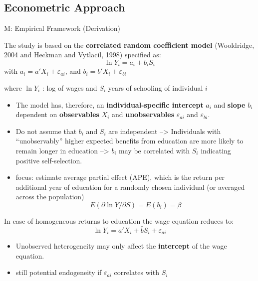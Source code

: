 \documentclass[10pt,ignorenonframetext,]{beamer}
\begin{document}
\hypertarget{econometric-approach}{%
\subsection{Econometric Approach}\label{econometric-approach}}

\begin{frame}[allowframebreaks]{M: Empirical Framework (Derivation)}
\protect\hypertarget{m-empirical-framework-derivation}{}

The study is based on the \textbf{correlated random coefficient model}
(Wooldridge, 2004 and Heckman and Vytlacil, 1998) specified as:
\[\ln Y_i = a_i + b_i S_i\] with \(a_i = a'X_i + \varepsilon_{ai}\), and
\(b_i = b'X_i + \varepsilon_{bi}\)

where \(\ln Y_i\) : log of wages and \(S_i\) years of schooling of
individual \(i\)

\begin{itemize}
\item
  The model has, therefore, an \textbf{individual-specific intercept}
  \(a_i\) and \textbf{slope} \(b_i\) dependent on \textbf{observables}
  \(X_i\) and \textbf{unobservables} \(\varepsilon_{ai}\) and
  \(\varepsilon_{bi}\).
\item
  Do not assume that \(b_i\) and \(S_i\) are independent
  --\textgreater{} Individuals with ``unobservably'' higher expected
  benefits from education are more likely to remain longer in education
  --\textgreater{} \(b_i\) may be correlated with \(S_i\) indicating
  positive self-selection.
\item
  focus: estimate average partial effect (APE), which is the return per
  additional year of education for a randomly chosen individual (or
  averaged across the population)
  \[E(\partial \ln Y / \partial S) = E(b_i) = \beta\]
\end{itemize}

In case of homogeneous returns to education the wage equation reduces
to: \[\ln Y_i = a'X_i + \bar b S_i + \varepsilon_{ai}\]

\begin{itemize}
\item
  Unobserved heterogeneity may only affect the \textbf{intercept} of the
  wage equation.
\item
  still potential endogeneity if \(\varepsilon_{ai}\) correlates with
  \(S_i\)
\end{itemize}

\end{frame}
\end{document}
